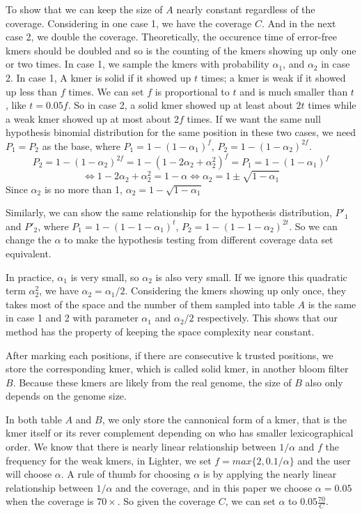 \documentclass[10pt]{article}
\begin{document}
To show that we can keep the size of $A$ nearly constant regardless of the coverage. Considering in one case 1, we have the coverage $C$. And in the next case 2, we double the coverage. Theoretically, the occurence time of error-free kmers should be doubled and so is the counting of the kmers showing up only one or two times. In case 1, we sample the kmers with probability $\alpha_1$, and $\alpha_2$ in case 2. In case 1, A kmer is solid if it showed up $t$ times; a kmer is weak if it showed up less than $f$ times. We can set $f$ is proportional to $t$ and is much smaller than $t$, like $t=0.05f$. So in case 2, a solid kmer showed up at least about $2t$ times while a weak kmer showed up at most about $2f$ times. If we want the same null hypothesis binomial distribution for the same position in these two cases, we need $P_1=P_2$ as the base, where $P_1=1-(1-\alpha_1)^f$, $P_2=1-(1-\alpha_2)^{2f}$. 
$$P_2=1-(1-\alpha_2)^{2f}=1-(1-2\alpha_2+\alpha_2^2)^f=P_1=1-(1-\alpha_1)^f$$
$$\Leftrightarrow 1-2\alpha_2+\alpha_2^2=1-\alpha \Leftrightarrow \alpha_2=1 \pm \sqrt{1-\alpha_1}$$
Since $\alpha_2$ is no more than 1, $\alpha_2=1-\sqrt{1-\alpha_1}$

Similarly, we can show the same relationship for the hypothesis distribution, $P'_1$ and $P'_2$, where $P_1=1-(1-1-\alpha_1)^t$, $P_2=1-(1-1-\alpha_2)^{2t}$. So we can change the $\alpha$ to make the hypothesis testing from different coverage data set equivalent.

In practice, $\alpha_1$ is very small, so $\alpha_2$ is also very small. If we ignore this quadratic term $\alpha_2^2$, we have $\alpha_2=\alpha_1 / 2$. Considering the kmers showing up only once, they takes most of the space and the number of them sampled into table $A$ is the same in case 1 and 2 with parameter $\alpha_1$ and $\alpha_2/2$ respectively. This shows that our method has the property of keeping the space complexity near constant. 

After marking each positions, if there are consecutive k trusted positions, we store the corresponding kmer, which is called solid kmer, in another bloom filter $B$. Because these kmers are likely from the real genome, the size of $B$ also only depends on the genome size. 

In both table $A$ and $B$, we only store the cannonical form of a kmer, that is the kmer itself or its rever complement depending on who has smaller lexicographical order. We know that there is nearly linear relationship between $1/\alpha$ and $f$ the frequency for the weak kmers, in Lighter, we set $f=max\{2,0.1/\alpha\}$ and the user will choose $\alpha$. A rule of thumb for choosing $\alpha$ is by applying the nearly linear relationship between $1/\alpha$ and the coverage, and in this paper we choose $\alpha=0.05$ when the coverage is $70\times$. So given the coverage $C$, we can set $\alpha$ to $0.05\frac{70}{C}$. 
\end{document}
